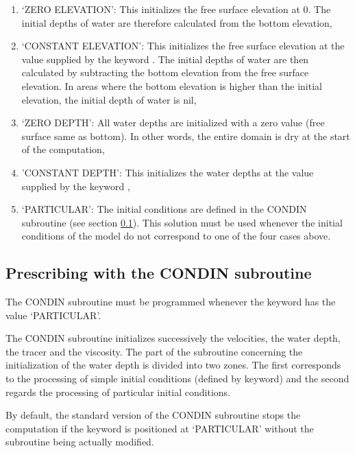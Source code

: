 \begin{enumerate}
\item  `ZERO ELEVATION': This initializes the free surface elevation at 0. The initial depths of water are therefore calculated from the bottom elevation,

\item  `CONSTANT ELEVATION': This initializes the free surface elevation at the value supplied by the keyword . The initial depths of water are then calculated by subtracting the bottom elevation from the free surface elevation. In areas where the bottom elevation is higher than the initial elevation, the initial depth of water is nil,

\item  `ZERO DEPTH': All water depths are initialized with a zero value (free surface same as bottom). In other words, the entire domain is dry at the start of the computation,

\item  'CONSTANT DEPTH': This initializes the water depths at the value supplied by the keyword ,

\item  `PARTICULAR': The initial conditions are defined in the CONDIN subroutine (see section \ref{subs:presc:CONDIN}). This solution must be used whenever the initial conditions of the model do not correspond to one of the four cases above.
\end{enumerate}


\subsection{ Prescribing with the CONDIN subroutine}
\label{subs:presc:CONDIN}

 The CONDIN subroutine must be programmed whenever the keyword  has the value `PARTICULAR'.

 The CONDIN subroutine initializes successively the velocities, the water depth, the tracer and the viscosity. The part of the subroutine concerning the initialization of the water depth is divided into two zones. The first corresponds to the processing of simple initial conditions (defined by keyword) and the second regards the processing of particular initial conditions.

 By default, the standard version of the CONDIN subroutine stops the computation if the keyword  is positioned at `PARTICULAR' without the subroutine being actually modified.

